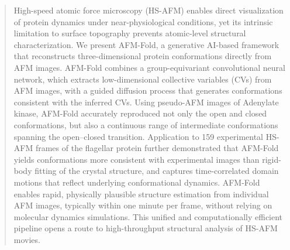\begin{abstract}
High-speed atomic force microscopy (HS-AFM) enables direct visualization of protein dynamics under near-physiological conditions, yet its intrinsic limitation to surface topography prevents atomic-level structural characterization. We present AFM-Fold, a generative AI-based framework that reconstructs three-dimensional protein conformations directly from AFM images. AFM-Fold combines a group-equivariant convolutional neural network, which extracts low-dimensional collective variables (CVs) from AFM images, with a guided diffusion process that generates conformations consistent with the inferred CVs.
Using pseudo-AFM images of Adenylate kinase, AFM-Fold accurately reproduced not only the open and closed conformations, but also a continuous range of intermediate conformations spanning the open--closed transition. Application to 159 experimental HS-AFM frames of the flagellar protein \flhac further demonstrated that AFM-Fold yields conformations more consistent with experimental images than rigid-body fitting of the crystal structure, and captures time-correlated domain motions that reflect underlying conformational dynamics.
AFM-Fold enables rapid, physically plausible structure estimation from individual AFM images, typically within one minute per frame, without relying on molecular dynamics simulations. This unified and computationally efficient pipeline opens a route to high-throughput structural analysis of HS-AFM movies.
\end{abstract}
